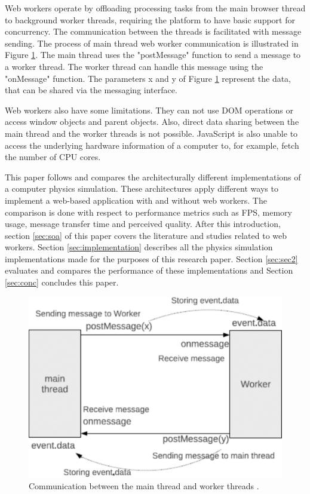 \documentclass[conference]{IEEEtran}
\begin{document}
Web workers operate by offloading processing tasks from the main browser thread to background worker threads, requiring the platform to have basic support for concurrency. 
The communication between the threads is facilitated with message sending. The process of main thread web worker communication is illustrated in Figure \ref{fig:figure1}. 
The main thread uses the "postMessage" function to send a message to a worker thread. The worker thread can handle this message using the "onMessage" function. The parameters x and y of Figure \ref{fig:figure1} represent the data, that can be shared via the messaging interface. \cite{doha, watanabe}

Web workers also have some limitations. They can not use DOM operations or access window objects and parent objects. Also, direct data sharing between the main thread and 
the worker threads is not possible. JavaScript is also unable to access the underlying hardware information of a computer to, for example, fetch the number of CPU cores. \cite{watanabe, verdu}

This paper follows and compares the architecturally different implementations of a computer physics simulation. These architectures apply different ways to implement a 
web-based application with and without web workers. The comparison is done with respect to performance metrics such as FPS, memory usage, message transfer time and 
perceived quality. After this introduction, section \ref{sec:soa} of this paper covers the literature and studies related to web workers. Section \ref{sec:implementation} describes all the
physics simulation implementations made for the purposes of this research paper. Section \ref{sec:sec2} evaluates and compares the performance of these implementations and
Section \ref{sec:conc} concludes this paper.

\begin{figure}[ht]
	\centering
	\includegraphics[scale=0.25]{figs/figure1.png}
	\caption{Communication between the main thread and worker threads \cite{watanabe}.}
	\label{fig:figure1}
\end{figure}
\end{document}
